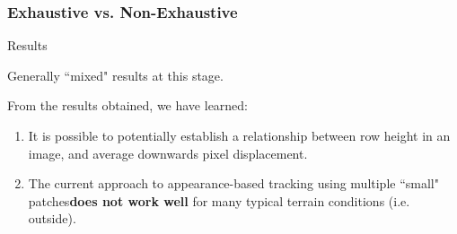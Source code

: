 \documentclass[10pt, compress]{beamer}
\begin{document}
\begin{frame}[fragile]
  \frametitle{Exhaustive vs. Non-Exhaustive}

  
\end{frame}


\begin{frame}{Results}

Generally ``mixed" results at this stage. \\ \vspace{0.5cm}

From the results obtained, we have learned:

\begin{enumerate}[label={\arabic*.}]
  \item It is possible to potentially establish a relationship between row height in an image, and average downwards pixel displacement.
  \item The current approach to appearance-based tracking using multiple ``small" patches\textbf{does not work well} for many typical terrain conditions (i.e. outside). 
\end{enumerate}

\end{frame}
\end{document}
